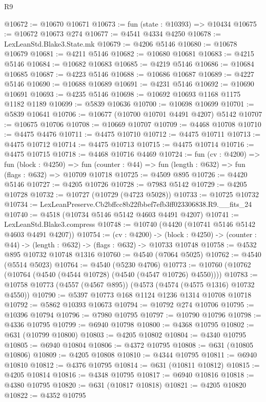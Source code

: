 \begin{lexlean}{R9}
\begin{coremodule}
@10672 := @10670 @10671
@10673 := fun (state : @10393) => @10434
@10675 := @10672 @10673 @274
@10677 := @4541 @4334 @4250
@10678 := LexLeanStd.Blake3.State.mk
@10679 := @4206 @5146
@10680 := @10678 @10679
@10681 := @4211 @5146
@10682 := @10680 @10681
@10683 := @4215 @5146
@10684 := @10682 @10683
@10685 := @4219 @5146
@10686 := @10684 @10685
@10687 := @4223 @5146
@10688 := @10686 @10687
@10689 := @4227 @5146
@10690 := @10688 @10689
@10691 := @4231 @5146
@10692 := @10690 @10691
@10693 := @4235 @5146
@10698 := @10692 @10693 @1168 @1175 @1182 @1189
@10699 := @5839 @10636
@10700 := @10698 @10699
@10701 := @5839 @10641
@10706 := @10677 (@10700 @10701 @4491 @4207) @5142
@10707 := @10675 @10706
@10708 := @10669 @10707
@10709 := @4468 @10708
@10710 := @4475 @4476
@10711 := @4475 @10710
@10712 := @4475 @10711
@10713 := @4475 @10712
@10714 := @4475 @10713
@10715 := @4475 @10714
@10716 := @4475 @10715
@10718 := @4468 @10716 @4469
@10724 := fun (cv : @4200) =>
  fun (block : @4250) =>
  fun (counter : @44) => fun (length : @632) => fun (flags : @632) => @10709 @10718
@10725 := @4509 @895
@10726 := @4420 @5146
@10727 := @4205 @10726
@10728 := @7983 @5142
@10729 := @4205 @10728
@10732 := @10727 (@10729 (@4723 @5028))
@10733 := @10725 @10732
@10734 := LexLeanPreserve.Cb2bffcc8b22fbbef7efb3ff023306838.R9.__fits_24
@10740 := @4518 (@10734 @5146 @5142 @4603 @4491 @4207)
@10741 := LexLeanStd.Blake3.compress
@10748 := @10740 (@4420 (@10741 @5146 @5142 @4603 @4491 @4207))
@10754 := (cv : @4200) ->
  (block : @4250) -> (counter : @44) -> (length : @632) -> (flags : @632) -> @10733 @10748
@10758 := @4532 @895 @10732 @10748 @1316
@10760 := @4540 (@7064 @5025)
@10762 := @4540 (@5514 @5023)
@10764 := @4540 (@5230 @4706)
@10773 := @10760 (@10762 (@10764 (@4540 (@4544 @10728) (@4540 (@4547 @10726) @4550))))
@10783 := @10758 @10773 (@4557 (@4567 @895)) (@4573 (@4574 (@4575 @1316) @10732 @4550))
@10790 := @5397 @10773 @168 @1124 @1236 @1314 @10708 @10718
@10792 := @5862 @10393 @10673
@10794 := @10792 @274 @10706
@10795 := @10396 @10794
@10796 := @7980 @10795
@10797 := @10790 @10796
@10798 := @4336 @10795
@10799 := @6940 @10798
@10800 := @4368 @10795
@10802 := @631 (@10799 @10800)
@10803 := @4205 @10802
@10804 := @4340 @10795
@10805 := @6940 @10804
@10806 := @4372 @10795
@10808 := @631 (@10805 @10806)
@10809 := @4205 @10808
@10810 := @4344 @10795
@10811 := @6940 @10810
@10812 := @4376 @10795
@10814 := @631 (@10811 @10812)
@10815 := @4205 @10814
@10816 := @4348 @10795
@10817 := @6940 @10816
@10818 := @4380 @10795
@10820 := @631 (@10817 @10818)
@10821 := @4205 @10820
@10822 := @4352 @10795

\end{coremodule}
\end{lexlean}
